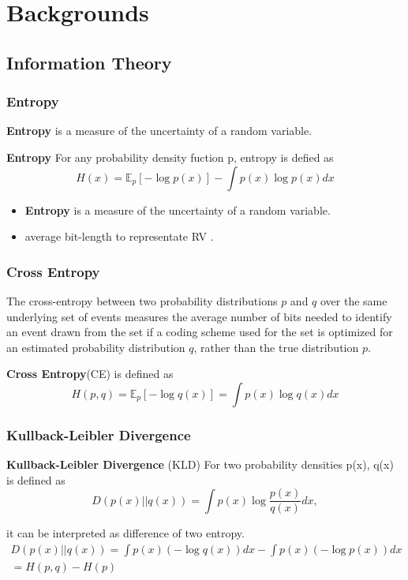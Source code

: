 \documentclass[aspectratio=169]{beamer}
\begin{document}
\section{Backgrounds}
\subsection{Information Theory}
\begin{frame}
	\frametitle{Entropy}
	\textbf{Entropy} is a measure of the uncertainty of a random variable.
	\begin{definition}
		\textbf{Entropy} For any probability density fuction p, entropy is defied as
		\begin{equation*}H(x) = \mathbb{E}_p [-\log p(x)] - \int {p(x)\log{p(x)}dx}\end{equation*}
	\end{definition}
	\begin{itemize}
		\item \textbf{Entropy} is a measure of the uncertainty of a random variable.
		\item average bit-length to representate RV \cite{shannon1948mathematical}.
	\end{itemize}
\end{frame}

\begin{frame}
	\frametitle{Cross Entropy}
	The cross-entropy between two probability distributions $p$ and $q$
	over the same underlying set of events measures
	the average number of bits needed to identify an event
	drawn from the set if a coding scheme used for the set
	is optimized for an estimated probability distribution $q$, rather than the true distribution $p$.
	\begin{definition}
		\textbf{Cross Entropy}(CE) is defined as 
		\begin{equation*}H(p, q) = \mathbb{E}_p [-\log q(x)] = \int p(x) \log q(x)dx\end{equation*}
	\end{definition}
	\end{frame}

\begin{frame}
	\frametitle{Kullback-Leibler Divergence}
	\begin{definition}
		\textbf{Kullback-Leibler Divergence} (KLD) For two probability densities p(x), q(x) is defined as
		\begin{equation*}D(p(x)||q(x))
			= \int p(x) \log \frac{p(x)}{q(x)}dx,\end{equation*}
	\end{definition}
	it can be interpreted as difference of two entropy.
	\begin{align*}
		D(p(x)||q(x)) = \int p(x) (-\log{q(x)})dx - \int p(x) (-\log{p(x)})dx \\
		= H(p, q) - H(p)
	\end{align*}
\end{frame}
\end{document}
